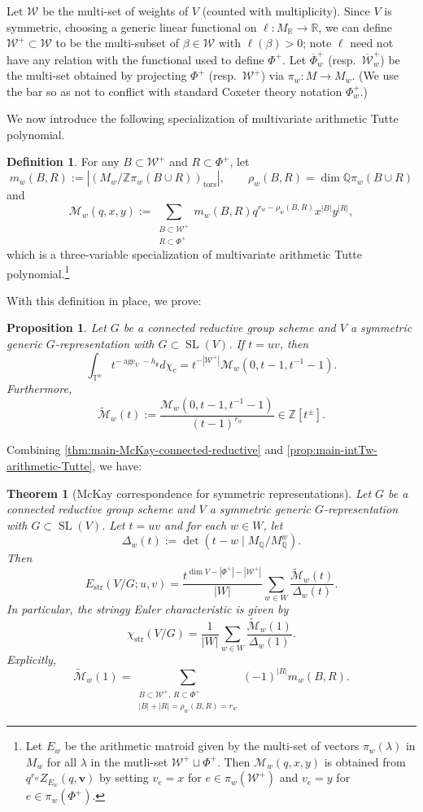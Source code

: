 \documentclass[12pt,a4paper]{amsart}
\newtheorem{theorem}{Theorem}
\newtheorem{proposition}[proposition]{Proposition}
\theoremstyle{definition}
\newtheorem{definition}[definition]{Definition}
\newcommand{\TT}{\mathbb T}
\newcommand{\ZZ}{\mathbb{Z}}
\newcommand{\QQ}{\mathbb{Q}}
\newcommand{\RR}{\mathbb{R}}
\newcommand{\cW}{\mathcal{W}}
\newcommand{\cM}{\mathcal{M}}
\newcommand{\g}{\mathfrak{g}}
\newcommand{\str}{\mathrm{str}}
\renewcommand{\1}{\textbf{1}}
\newcommand{\<}{\langle}
\renewcommand{\>}{\rangle}
\DeclareMathOperator{\age}{age}
\DeclareMathOperator{\tors}{tors}
\DeclareMathOperator{\SL}{SL}
\begin{document}
Let $\cW$ be the multi-set of weights of $V$ (counted with multiplicity). Since $V$ is symmetric, choosing a generic linear functional on $\ell\colon M_\RR\to\RR$, we can define $\cW^+\subset\cW$ to be the multi-subset of $\beta\in\cW$ with $\ell(\beta)>0$; note $\ell$ need not have any relation with the functional used to define $\Phi^+$. Let $\overline{\Phi}^+_w$ (resp.~$\overline{\cW}^+_w$) be the multi-set obtained by projecting $\Phi^+$ (resp.~$\cW^+$) via $\pi_w\colon M\to M_w$. (We use the bar so as not to conflict with standard Coxeter theory notation $\Phi^+_w$.) 

We now introduce the following specialization of multivariate arithmetic Tutte polynomial.

\begin{definition}\label{def:specialization-mat-poly}
For any $B\subset\cW^+$ and $R\subset\Phi^+$, let
\[
	m_w(B,R):=|( M_w/\ZZ\pi_w(B\cup R))_{\tors}|,\qquad \rho_w(B,R)=\dim\QQ\pi_w(B\cup R)
\]
and
\[
	\cM_w(q,x,y):=\sum_{\substack{B\subset\cW^+\\ R\subset\Phi^+}} m_w(B,R)q^{r_w-\rho_w(B,R)}x^{|B|}y^{|R|},
\]
which is a three-variable specialization of multivariate arithmetic Tutte polynomial.\footnote{Let $E_w$ be the arithmetic matroid given by the multi-set of vectors $\pi_w(\lambda)$ in $ M_w$ for all $\lambda$ in the mutli-set $\cW^+\sqcup\Phi^+$. Then $\cM_w(q,x,y)$ is obtained from $q^{r_w}Z_{E_w}(q,\textbf{v})$ by setting $v_e=x$ for $e\in\pi_w(\cW^+)$ and $v_e=y$ for $e\in\pi_w(\Phi^+)$.}
\end{definition}

With this definition in place, we prove:

\begin{proposition}\label{prop:main-intTw-arithmetic-Tutte}
Let $G$ be a connected reductive group scheme and $V$ a symmetric generic $G$-representation with $G\subset\SL(V)$. If $t=uv$, then
\[
	\int_{\TT^w}t^{-\age_V-h_\g}d\chi_c=t^{-|\cW^+|}\cM_w(0,t-1,t^{-1}-1).
\]
Furthermore, 
\[
	\widetilde{\cM}_w(t):=\frac{\cM_w(0,t-1,t^{-1}-1)}{(t-1)^{r_w}}\in\ZZ[t^\pm].
\]
\end{proposition}

Combining \autoref{thm:main-McKay-connected-reductive} and \autoref{prop:main-intTw-arithmetic-Tutte}, we have:


\begin{theorem}[{McKay correspondence for symmetric representations}]\label{thm:main-McKay-connected-reductive-symmetric}
Let $G$ be a connected reductive group scheme and $V$ a symmetric generic $G$-representation with $G\subset\SL(V)$. Let $t=uv$ and for each $w\in W$, let
\[
	\Delta_w(t):=\det(t-w\mid M_\QQ/M_\QQ^w).
\]
Then
\[
	E_{\str}(V/G;u,v)=\frac{t^{\dim V-|\Phi^+|-|\cW^+|}}{|W|}\sum_{w\in W}\frac{\widetilde{\cM}_w(t)}{\Delta_w(t)}.
\]
In particular, the stringy Euler characteristic is given by
\[
	\chi_{\str}(V/G)=\frac{1}{|W|}\sum_{w\in W}\frac{\widetilde{\cM}_w(1)}{\Delta_w(1)}.
\]
Explicitly, 
\[
	\widetilde{\cM}_w(1)=\!\!\!\!\!\!\!\!\!\sum_{\substack{B\subset\cW^+,\, R\subset\Phi^+\\ |B|+|R|=\rho_w(B,R)=r_w}}\!\!\!\!\!\!\!\!\!\!\!\!(-1)^{|R|}m_w(B,R).
\]
\end{theorem}
\end{document}
